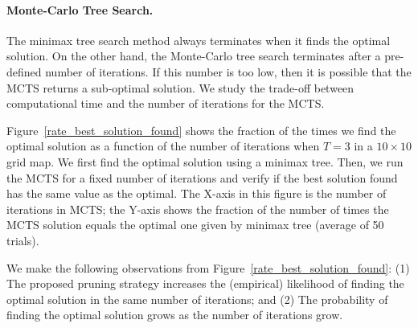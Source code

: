 \documentclass[10 pt, conference]{ieeeconf}
\begin{document}
\paragraph{Monte-Carlo Tree Search.} The minimax tree search method always terminates when it finds the optimal solution. On the other hand, the Monte-Carlo tree search terminates after a pre-defined number of iterations. If this number is too low, then it is possible that the MCTS returns a sub-optimal solution.  We study the trade-off between computational time and the number of iterations for the MCTS.

\begin{figure}
\end{figure}

Figure~\ref{rate_best_solution_found} shows the fraction of the times we find the optimal solution as a function of the number of iterations when $T=3$ in a $10\times 10$ grid map. We first find the optimal solution using a minimax tree. Then, we run the MCTS for a fixed number of iterations and verify if the best solution found has the same value as the optimal. The X-axis in this figure is the number of iterations in MCTS; the Y-axis shows the fraction of the number of times the MCTS solution equals the optimal one given by minimax tree (average of 50 trials). 

We make the following observations from Figure~\ref{rate_best_solution_found}: (1) The proposed pruning strategy increases the (empirical) likelihood of finding the optimal solution in the same number of iterations; and (2) The probability of finding the optimal solution grows as the number of iterations grow.
\end{document}
